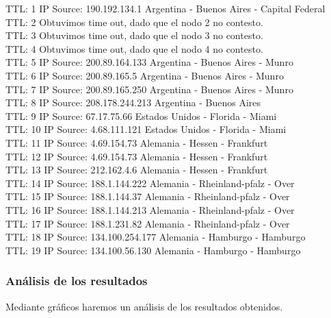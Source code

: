TTL:  1    IP Source: 190.192.134.1  Argentina - Buenos Aires - Capital Federal\\ 
TTL:  2    Obtuvimos time out, dado que el nodo 2 no contesto. \\
TTL:  3    Obtuvimos time out, dado que el nodo 3 no contesto. \\
TTL:  4    Obtuvimos time out, dado que el nodo 4 no contesto. \\
TTL:  5    IP Source: 200.89.164.133 Argentina - Buenos Aires - Munro\\  
TTL:  6    IP Source: 200.89.165.5 Argentina - Buenos Aires - Munro\\ 
TTL:  7    IP Source: 200.89.165.250 Argentina - Buenos Aires - Munro\\ 
TTL:  8    IP Source: 208.178.244.213 Argentina - Buenos Aires\\ 
TTL:  9    IP Source: 67.17.75.66 Estados Unidos - Florida - Miami\\ 
TTL: 10    IP Source: 4.68.111.121 Estados Unidos - Florida - Miami\\ 
TTL: 11    IP Source: 4.69.154.73 Alemania - Hessen - Frankfurt\\  
TTL: 12    IP Source: 4.69.154.73 Alemania - Hessen - Frankfurt\\ 
TTL: 13    IP Source: 212.162.4.6 Alemania - Hessen - Frankfurt\\ 
TTL: 14    IP Source: 188.1.144.222 Alemania - Rheinland-pfalz - Over\\  
TTL: 15    IP Source: 188.1.144.37 Alemania - Rheinland-pfalz - Over\\
TTL: 16    IP Source: 188.1.144.213 Alemania - Rheinland-pfalz - Over\\ 
TTL: 17    IP Source: 188.1.231.82 Alemania - Rheinland-pfalz - Over\\ 
TTL: 18    IP Source: 134.100.254.177 Alemania - Hamburgo - Hamburgo\\  
TTL: 19    IP Source: 134.100.56.130 Alemania - Hamburgo - Hamburgo\\ 
\newline

\subsubsection{An\'alisis de los resultados}
Mediante gr\'aficos haremos un an\'alisis de los resultados obtenidos. \newline

